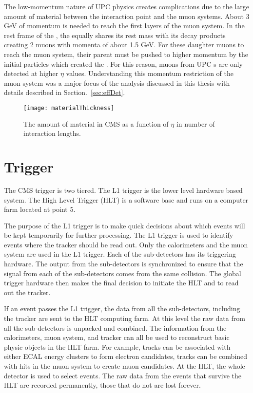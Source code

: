     The low-momentum nature of UPC physics creates complications due to the 
      large amount of material between the interaction point and the muon 
      systems.
    About 3 GeV of momentum is needed to reach the first layers of the muon 
      system.
    In the rest frame of the \JPsi{}, the \JPsi{} equally shares its rest mass with 
      its decay products creating 2 muons with momenta of about 1.5 GeV.
    For these daughter muons to reach the muon system, their parent \JPsi{} must
      be pushed to higher momentum by the initial particles which created the
      \JPsi{}.
    For this reason, muons from UPC \JPsi{}s are only detected at higher 
      $\eta$ values.
    Understanding this momentum restriction of the muon system was a major 
      focus of the analysis discussed in this thesis with details described in 
      Section.~\ref{sec:effDet}.
    \begin{figure}[!Hhbt]
      \centering
      \texttt{[image: materialThickness]}
      \caption{The amount of material in CMS as a function of $\eta$ in 
        number of interaction lengths.}
      \label{fig:matThick}
    \end{figure}
 
  \section{\label{sec:detTrg}Trigger}
    The CMS trigger is two tiered. 
    The L1 trigger is the lower level hardware based system. 
    The High Level Trigger (HLT) is a software base and runs on a computer farm
      located at point 5.

    The purpose of the L1 trigger is to make quick decisions about which events
      will be kept temporarily for further processing.
    The L1 trigger is used to identify events where the tracker should be read
      out.
    Only the calorimeters and the muon system are used in the L1 trigger.
    Each of the sub-detectors has its triggering hardware.
    The output from the sub-detectors is synchronized to ensure that the signal
      from each of the sub-detectors comes from the same collision. 
    The global trigger hardware then makes the final decision to initiate the 
      HLT and to read out the tracker. 

    If an event passes the L1 trigger, the data from all the sub-detectors,
      including the tracker are sent to the HLT computing farm. 
    At this level the raw data from all the sub-detectors is unpacked and 
      combined.
    The information from the calorimeters, muon system, and tracker can all 
      be used to reconstruct basic physic objects in the HLT farm. 
    For example, tracks can be associated with either ECAL energy clusters to 
      form electron candidates, tracks can be combined with hits in the muon
      system to create muon candidates.
    At the HLT, the whole detector is used to select events.
    The raw data from the events that survive the HLT are recorded permanently,
      those that do not are lost forever. 

